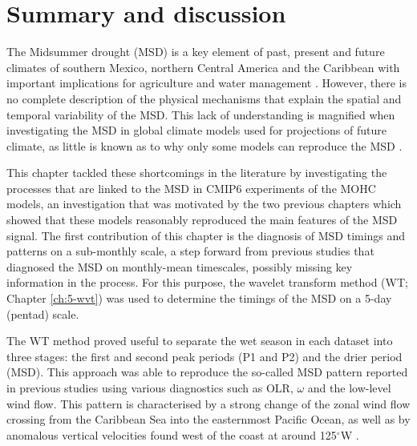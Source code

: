 \section{Summary and discussion}\label{sq:sumdiscuss}

The Midsummer drought (MSD) is a key element of past, present and future climates of southern Mexico, northern Central America and the Caribbean with important implications for agriculture and water management \citep{hellin2017,de2018,harvey2018}. However, there is no complete description of the physical mechanisms that explain the spatial and temporal variability of the MSD. This lack of understanding is magnified when investigating the MSD in global climate models used for projections of future climate, as little is known as to why only some models can reproduce the MSD \citep{ryu2014}.


This chapter tackled these shortcomings in the literature by investigating the processes that are linked to the MSD in CMIP6 experiments of the MOHC models, an investigation that was motivated by the two previous chapters which showed that these models reasonably reproduced the main features of the MSD signal.
The first contribution of this chapter is the diagnosis of MSD timings and patterns on a sub-monthly scale, a step forward from previous studies that diagnosed the MSD on monthly-mean timescales, possibly missing key information in the process. 
For this purpose, the wavelet transform method (WT; Chapter \ref{ch:5-wvt}) was used to determine the timings of the MSD on a 5-day (pentad) scale. 


The WT method proved useful to separate the wet season in each dataset into three stages: the first and second peak periods (P1 and P2) and the drier period (MSD). 
This approach was able to reproduce the so-called MSD pattern reported in previous studies \citep{zermeno2019,zhao2020} using various diagnostics such as OLR, $\omega$ and the low-level wind flow. This pattern is characterised by a strong change of the zonal wind flow crossing from the Caribbean Sea into the easternmost Pacific Ocean, as well as by anomalous vertical velocities found west of the coast at around 125$^\circ$W \citep{herrera2015,zermeno2019}. 

